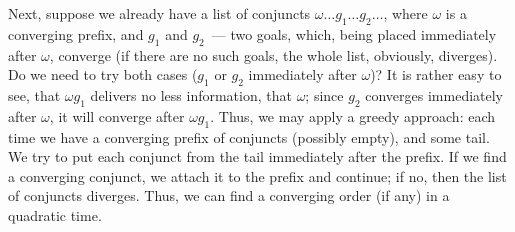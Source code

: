 Next, suppose we already have a list of conjuncts \mbox{$\omega\dots g_1\dots g_2\dots$}, where $\omega$ is a converging prefix, and
$g_1$ and $g_2$~--- two goals, which, being placed immediately after $\omega$, converge (if there are no such
goals, the whole list, obviously, diverges). Do we need to try both cases ($g_1$ or $g_2$ immediately after $\omega$)? 
It is rather easy to see, that \mbox{$\omega g_1$} delivers no less information, that \mbox{$\omega$}; since
$g_2$ converges immediately after $\omega$, it will converge after \mbox{$\omega g_1$}. Thus, we may apply a greedy approach: each
time we have a converging prefix of conjuncts (possibly empty), and some tail. We try to put each conjunct from the tail 
immediately after the prefix. If we find a converging conjunct, we attach it to the prefix and continue; if no, then the list of 
conjuncts diverges. Thus, we can find a converging order (if any) in a quadratic time.



